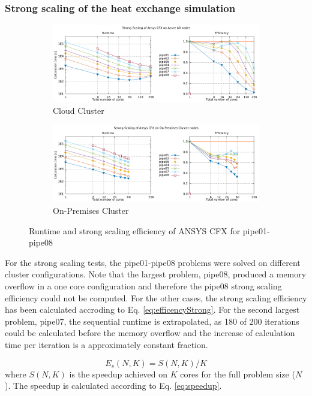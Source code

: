 \documentclass[3p,times]{elsarticle}
\begin{document}
\subsubsection{Strong scaling of the heat exchange simulation}
\begin{figure}

	\begin{subfigure}{\textwidth}
		\centering
		\includegraphics[width=.7\linewidth]{gplt-a8-strong-pipe}	
		\caption{Cloud Cluster}
		\label{fig:strongA8}
	\end{subfigure}

		\begin{subfigure}{\textwidth}
			\centering
			\includegraphics[width=.7\linewidth]{gplt-hsr-strong-pipe}
			\caption{On-Premises Cluster}
			\label{fig:strongHSR}
		\end{subfigure}
	\caption{Runtime and strong scaling efficiency of ANSYS CFX for pipe01-pipe08}
\end{figure}

For the strong scaling tests, the pipe01-pipe08 problems were solved on different cluster configurations. Note that the largest problem, pipe08, produced a memory overflow in a one core configuration and therefore the pipe08 strong scaling efficiency could not be computed. For the other cases, the strong scaling efficiency has been calculated accroding to Eq. \ref{eq:efficencyStrong}. For the second largest problem, pipe07, the sequential runtime is extrapolated, as 180 of 200 iterations could be calculated before the memory overflow and the increase of calculation time per iteration is a approximately constant fraction.



\begin{equation}
\label{eq:efficencyStrong}
E_s(N,K) = S(N,K) / K 
\end{equation}
where $S(N,K)$ is the speedup achieved on $K$ cores for the full problem size ($N$). The speedup is calculated according to Eq. \ref{eq:speedup}.
\end{document}
